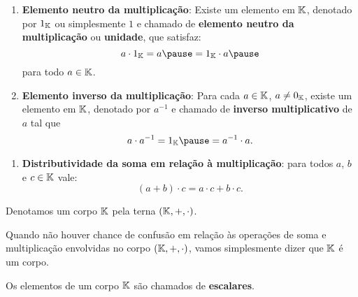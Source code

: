 \documentclass{beamer}
\begin{document}
    \begin{frame}
        \begin{definicao}
            \begin{enumerate}[label={\roman*})]
                \conti

		\item \textbf{Elemento neutro da multiplica\c{c}\~ao}: Existe um elemento em $\mathbb{K}$, \pause denotado por $1_{\mathbb{K}}$ \pause ou simplesmente $1$ \pause e chamado de \textbf{elemento neutro da multiplica\c{c}\~ao} \pause ou \textbf{unidade}, que satisfaz:\pause
		\[
			a \cdot 1_\cp{K} = a \pause = 1_\cp{K} \cdot a\pause
		\]
		para todo $a \in \mathbb{K}$.\pause
            \item \textbf{Elemento inverso da multiplica\c{c}\~ao}: Para cada $a \in \mathbb{K}$, \pause $a \ne 0_{\mathbb{K}}$, \pause existe um elemento em $\mathbb{K}$, \pause denotado por $a^{-1}$ \pause e chamado de \textbf{inverso multiplicativo} de $a$ tal que\pause
		\[
			a \cdot a^{-1} = 1_\cp{K} \pause = a^{-1} \cdot a.
		\]
                \seti
            \end{enumerate}
        \end{definicao}
    \end{frame}
    
    \begin{frame}
        \begin{definicao}
            \begin{enumerate}[label={\roman*})]
                \conti

		\item \textbf{Distributividade da soma em rela\c{c}\~ao \`a multiplica\c{c}\~ao}: para todos $a$, $b$ e $c \in \mathbb{K}$ \pause vale:
                    \[
                        (a + b)\cdot c = a\cdot c + b\cdot c.
                    \]
	    \end{enumerate}
        \end{definicao}
    \end{frame}

    \begin{frame}
        Denotamos um corpo $\mathbb{K}$ pela terna $(\mathbb{K}, +, \cdot)$. \pause
        
        \vspace{.3cm}

        Quando n\~ao houver chance de confus\~ao em rela\c{c}\~ao \`as opera\c{c}\~oes de soma e multiplica\c{c}\~ao envolvidas no corpo $(\mathbb{K}, +, \cdot)$, \pause vamos simplesmente dizer que $\mathbb{K}$ \'e um corpo. \pause

        \vspace{.3cm}

        Os elementos de um corpo $\mathbb{K}$ s\~ao chamados de \textbf{escalares}.
    \end{frame}
    
\end{document}

